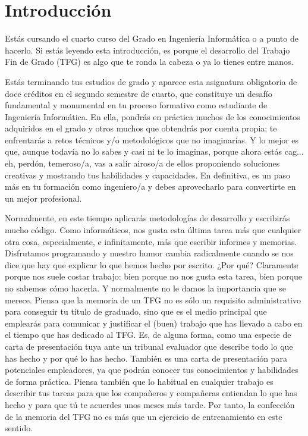 \chapter{Introducción}
\label{cap:Introducción}

Estás cursando el cuarto curso del Grado en Ingeniería Informática o a punto de hacerlo. Si estás leyendo esta introducción, es porque el desarrollo del Trabajo Fin de Grado (TFG) es algo que te ronda la cabeza o ya lo tienes entre manos.

Estás terminando tus estudios de grado y aparece esta asignatura obligatoria de doce créditos en el segundo semestre de cuarto, que constituye un desafío fundamental y monumental en tu proceso formativo como estudiante de Ingeniería Informática. En ella, pondrás en práctica muchos de los conocimientos adquiridos en el grado y otros muchos que obtendrás por cuenta propia; te enfrentarás a retos técnicos y/o metodológicos que no imaginarías. Y lo mejor es que, aunque todavía no lo sabes y casi ni te lo imaginas, porque ahora estás cag... eh, perdón, temeroso/a, vas a salir airoso/a de ellos proponiendo soluciones creativas y mostrando tus habilidades y capacidades. En definitiva, es un paso más en tu formación como ingeniero/a y debes aprovecharlo para convertirte en un mejor profesional.

Normalmente, en este tiempo aplicarás metodologías de desarrollo y escribirás mucho código. Como informáticos, nos gusta esta última tarea más que cualquier otra cosa, especialmente, e infinitamente, más que escribir informes y memorias. Disfrutamos programando y nuestro humor cambia radicalmente cuando se nos dice que hay que explicar lo que hemos hecho por escrito. ¿Por qué? Claramente porque nos suele costar trabajo: bien porque no nos gusta esta tarea, bien porque no sabemos cómo hacerla. Y normalmente no le damos la importancia que se merece. Piensa que la memoria de un TFG no es sólo un requisito administrativo para conseguir tu título de graduado, sino que es el medio principal que emplearás para comunicar y justificar el (buen) trabajo que has llevado a cabo en el tiempo que has dedicado al TFG. Es, de alguna forma, como una especie de carta de presentación tuya ante un tribunal evaluador que describe todo lo que has hecho y por qué lo has hecho. También es una carta de presentación para potenciales empleadores, ya que podrán conocer tus conocimientos y habilidades de forma práctica. Piensa también que lo habitual en cualquier trabajo es describir tus tareas para que los compañeros y compañeras entiendan lo que has hecho y para que tú te acuerdes unos meses más tarde. Por tanto, la confección de la memoria del TFG no es más que un ejercicio de entrenamiento en este sentido.

